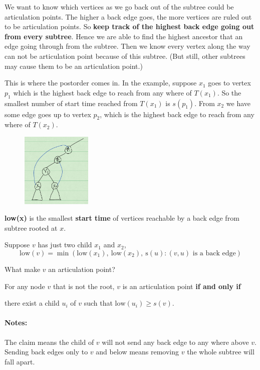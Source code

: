We want to know which vertices as we go back out of the subtree could be 
articulation points. The higher a back edge goes, the more vertices are ruled 
out to be articulation points. So \textbf{keep track of the highest back edge 
going out from every subtree}. Hence we are able to find the highest ancestor 
that an edge going through from the subtree. Then we know every vertex along the 
way can not be articulation point because of this subtree. (But still, other 
subtrees may cause them to be an articulation point.)

This is where the postorder comes in. In the example, suppose $x_1$ goes to vertex $p_1$ which is the highest back edge to reach from any where of $T(x_1)$. So the smallest number of start time reached from $T(x_1)$ is $s(p_1)$. From $x_2$ we have some edge goes up to vertex $p_2$, which is the highest back edge to reach from any where of $T(x_2)$.

\begin{figure}[H]
\centering
\includegraphics[width=0.3\textwidth]{dfs-claim.png}
\end{figure}

\begin{definition}
 \textbf{low(x)} is the smallest \textbf{start time} of vertices reachable by a back edge from subtree rooted at $x$. 
\end{definition}

Suppose $v$ has just two child $x_1$ and $x_2$,
\[\text{low}(v) = \min (\text{low}(x_1), ~\text{low}(x_2), ~\text{s}(u): (v, u) \text{ is a back edge})\]

What make $v$ an articulation point?
\begin{claim}
 For any node $v$ that is not the root, $v$ is an articulation point \textbf{if 
and only if }
 
 there exist a child $u_i$ of $v$ such that $\text{low}(u_i) \ge s(v)$.
\end{claim}

\paragraph{Notes:} The claim means the child of $v$ will not send any back edge 
to any where above $v$. Sending back edges only to $v$ and below means removing 
$v$ the whole subtree will fall apart.
